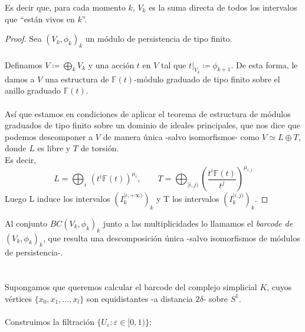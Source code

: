 \documentclass[12pt,a4paper]{article}
\begin{document}
Es decir que, para cada momento $k$, $V_k$ es la suma directa de todos los intervalos que ``están vivos en $k$''.
\begin{proof}
Sea $(V_k, \phi_k)_k$ un módulo de persistencia de tipo finito.
\\
\\
Definamos $\displaystyle V \coloneqq \bigoplus_k V_k$ y una acción $t$ en $V$ tal que $t|_{V_k} \coloneqq \phi_{k+1}$. De esta forma, le damos a $V$ una estructura de $\mathbb{F}(t)$-módulo graduado de tipo finito sobre el anillo graduado $\mathbb{F}(t)$.
\\
\\
Así que estamos en condiciones de aplicar el teorema de estructura de módulos graduados de tipo finito sobre un dominio de ideales principales, que nos dice que podemos descomponer a $V$ de manera única -salvo isomorfismos- como $V \simeq L \oplus T$, donde $L$ es libre y $T$ de torsión.
\\
Es decir, 
\[
L = \bigoplus_{i} \, (t^i\mathbb{F}(t))^{\mu_i}, \qquad T = \bigoplus_{[i,j)} (\frac{t^i\mathbb{F}(t)}{t^j})^{\mu_{i,j}}
\]
Luego L induce los intervalos $(I_k^{[i,+\infty)})_k$ y T los intervalos $(I_k^{[i,j)})_k$.
\end{proof}
Al conjunto $BC(V_k,\phi_k)_k$ junto a las multiplicidades lo llamamos el \textit{barcode de $(V_k, \phi_k)_k$}, que resulta una descomposición única -salvo isomorfismos de módulos de persistencia-.
\\
\\
\\
Supongamos que queremos calcular el barcode del complejo simplicial $K$, cuyos vértices $\{x_0, x_1, \ldots, x_{l}\}$ son equidistantes -a distancia $2\delta$- sobre $S^1$.
\\
\\
Construimos la filtración $\{U_\varepsilon: \varepsilon \in [0, 1)\}$:
\\
\end{document}
